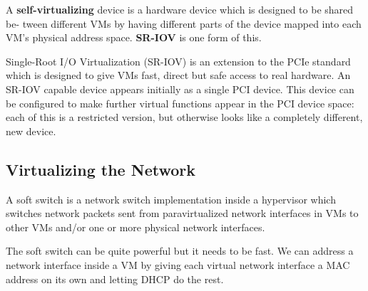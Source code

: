 A \textbf{self-virtualizing} device is a hardware device which is designed to be shared be- tween different VMs by having different parts of the device mapped into each VM’s physical address space. \textbf{SR-IOV} is one form of this. \medskip

Single-Root I/O Virtualization (SR-IOV) is an extension to the PCIe standard which is designed to give VMs fast, direct but safe access to real hardware. An SR-IOV capable device appears initially as a single PCI device. This device can be configured to make further virtual functions appear in the PCI device space: each of this is a restricted version, but otherwise looks like a completely different, new device.


\subsection{Virtualizing the Network}

A soft switch is a network switch implementation inside a hypervisor which switches network packets sent from paravirtualized network interfaces in VMs to other VMs and/or one or more physical network interfaces.\medskip

The soft switch can be quite powerful but it needs to be fast. We can address a network interface inside a VM by giving each virtual network interface a MAC address on its own and letting DHCP do the rest.
